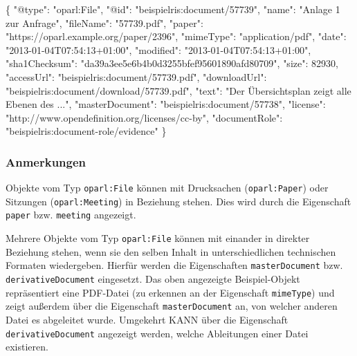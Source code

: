 \documentclass[,a4paper]{article}
\newenvironment{Shaded}{}{}
\newcommand{\DataTypeTok}[1]{\textcolor[rgb]{0.56,0.13,0.00}{{#1}}}
\newcommand{\DecValTok}[1]{\textcolor[rgb]{0.25,0.63,0.44}{{#1}}}
\newcommand{\StringTok}[1]{\textcolor[rgb]{0.25,0.44,0.63}{{#1}}}
\newcommand{\FunctionTok}[1]{\textcolor[rgb]{0.02,0.16,0.49}{{#1}}}
\begin{document}
\begin{Shaded}
\begin{Highlighting}[]
\FunctionTok{\{}
    \DataTypeTok{"@type"}\FunctionTok{:} \StringTok{"oparl:File"}\FunctionTok{,}
    \DataTypeTok{"@id"}\FunctionTok{:} \StringTok{"beispielris:document/57739"}\FunctionTok{,}
    \DataTypeTok{"name"}\FunctionTok{:} \StringTok{"Anlage 1 zur Anfrage"}\FunctionTok{,}
    \DataTypeTok{"fileName"}\FunctionTok{:} \StringTok{"57739.pdf"}\FunctionTok{,}
    \DataTypeTok{"paper"}\FunctionTok{:} \StringTok{"https://oparl.example.org/paper/2396"}\FunctionTok{,}
    \DataTypeTok{"mimeType"}\FunctionTok{:} \StringTok{"application/pdf"}\FunctionTok{,}
    \DataTypeTok{"date"}\FunctionTok{:} \StringTok{"2013-01-04T07:54:13+01:00"}\FunctionTok{,}
    \DataTypeTok{"modified"}\FunctionTok{:} \StringTok{"2013-01-04T07:54:13+01:00"}\FunctionTok{,}
    \DataTypeTok{"sha1Checksum"}\FunctionTok{:} \StringTok{"da39a3ee5e6b4b0d3255bfef95601890afd80709"}\FunctionTok{,}
    \DataTypeTok{"size"}\FunctionTok{:} \DecValTok{82930}\FunctionTok{,}
    \DataTypeTok{"accessUrl"}\FunctionTok{:} \StringTok{"beispielris:document/57739.pdf"}\FunctionTok{,}
    \DataTypeTok{"downloadUrl"}\FunctionTok{:} \StringTok{"beispielris:document/download/57739.pdf"}\FunctionTok{,}
    \DataTypeTok{"text"}\FunctionTok{:} \StringTok{"Der Übersichtsplan zeigt alle Ebenen des ..."}\FunctionTok{,}
    \DataTypeTok{"masterDocument"}\FunctionTok{:} \StringTok{"beispielris:document/57738"}\FunctionTok{,}
    \DataTypeTok{"license"}\FunctionTok{:} \StringTok{"http://www.opendefinition.org/licenses/cc-by"}\FunctionTok{,}
    \DataTypeTok{"documentRole"}\FunctionTok{:} \StringTok{"beispielris:document-role/evidence"}
\FunctionTok{\}}
\end{Highlighting}
\end{Shaded}

\subsubsection{Anmerkungen}\label{anmerkungen-2}

Objekte vom Typ \texttt{oparl:File} können mit Drucksachen
(\texttt{oparl:Paper}) oder Sitzungen (\texttt{oparl:Meeting}) in
Beziehung stehen. Dies wird durch die Eigenschaft \texttt{paper} bzw.
\texttt{meeting} angezeigt.

Mehrere Objekte vom Typ \texttt{oparl:File} können mit einander in
direkter Beziehung stehen, wenn sie den selben Inhalt in
unterschiedlichen technischen Formaten wiedergeben. Hierfür werden die
Eigenschaften \texttt{masterDocument} bzw. \texttt{derivativeDocument}
eingesetzt. Das oben angezeigte Beispiel-Objekt repräsentiert eine
PDF-Datei (zu erkennen an der Eigenschaft \texttt{mimeType}) und zeigt
außerdem über die Eigenschaft \texttt{masterDocument} an, von welcher
anderen Datei es abgeleitet wurde. Umgekehrt KANN über die Eigenschaft
\texttt{derivativeDocument} angezeigt werden, welche Ableitungen einer
Datei existieren.
\end{document}
